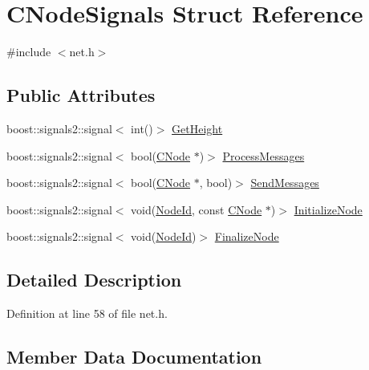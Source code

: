 \hypertarget{struct_c_node_signals}{}\section{C\+Node\+Signals Struct Reference}
\label{struct_c_node_signals}


{\ttfamily \#include $<$net.\+h$>$}

\subsection*{Public Attributes}
\begin{DoxyCompactItemize}
\item 
boost\+::signals2\+::signal$<$ int()$>$ \hyperlink{struct_c_node_signals_aa9f8b7c213d6c40be77242e8cbcf46e9}{Get\+Height}
\item 
boost\+::signals2\+::signal$<$ bool(\hyperlink{class_c_node}{C\+Node} $\ast$)$>$ \hyperlink{struct_c_node_signals_a9d5d5e496f424ee3331b3dcb0a0c558b}{Process\+Messages}
\item 
boost\+::signals2\+::signal$<$ bool(\hyperlink{class_c_node}{C\+Node} $\ast$, bool)$>$ \hyperlink{struct_c_node_signals_a72f761e2001b2cd5355b20e1168bf903}{Send\+Messages}
\item 
boost\+::signals2\+::signal$<$ void(\hyperlink{net_8h_a954d746a58632565552615fd0a4ee660}{Node\+Id}, const \hyperlink{class_c_node}{C\+Node} $\ast$)$>$ \hyperlink{struct_c_node_signals_a137e1854c9fea8a56e5f30be76da8b86}{Initialize\+Node}
\item 
boost\+::signals2\+::signal$<$ void(\hyperlink{net_8h_a954d746a58632565552615fd0a4ee660}{Node\+Id})$>$ \hyperlink{struct_c_node_signals_a4fb2ed0335cbfa8daf5f43a0b42ec481}{Finalize\+Node}
\end{DoxyCompactItemize}


\subsection{Detailed Description}


Definition at line 58 of file net.\+h.



\subsection{Member Data Documentation}
\hypertarget{struct_c_node_signals_a4fb2ed0335cbfa8daf5f43a0b42ec481}{}
